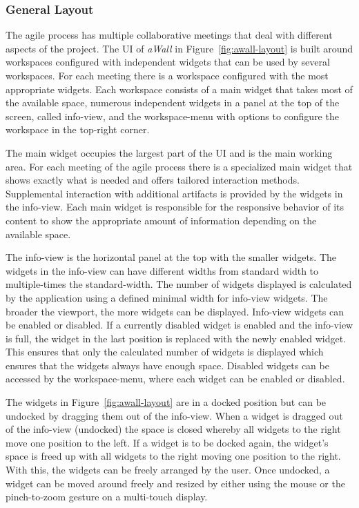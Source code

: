 \documentclass{sigchi}
\begin{document}
\subsubsection{General Layout}

The agile process has multiple collaborative meetings that deal with different aspects of the project.
The UI of \textit{aWall} in Figure~\ref{fig:awall-layout} is built around workspaces configured with independent widgets that can be used by several workspaces.
For each meeting there is a workspace configured with the most appropriate widgets.
Each workspace consists of a main widget that takes most of the available space, numerous independent widgets in a panel at the top of the screen, called info-view, and the workspace-menu with options to configure the workspace in the top-right corner.

The main widget occupies the largest part of the UI and is the main working area.
For each meeting of the agile process there is a specialized main widget that shows exactly what is needed and offers tailored interaction methods.
Supplemental interaction with additional artifacts is provided by the widgets in the info-view.
Each main widget is responsible for the responsive behavior of its content to show the appropriate amount of information depending on the available space.

The info-view is the horizontal panel at the top with the smaller widgets.
The widgets in the info-view can have different widths from standard width to multiple-times the standard-width.
The number of widgets displayed is calculated by the application using a defined minimal width for info-view widgets. 
The broader the viewport, the more widgets can be displayed.
Info-view widgets can be enabled or disabled.
If a currently disabled widget is enabled and the info-view is full, the widget in the last position is replaced with the newly enabled widget.
This ensures that only the calculated number of widgets is displayed which ensures that the widgets always have enough space.
Disabled widgets can be accessed by the workspace-menu, where each widget can be enabled or disabled. 

The widgets in Figure~\ref{fig:awall-layout} are in a docked position but can be undocked by dragging them out of the info-view.
When a widget is dragged out of the info-view (undocked) the space is closed whereby all widgets to the right move one position to the left.
If a widget is to be docked again, the widget's space is freed up with all widgets to the right moving one position to the right.
With this, the widgets can be freely arranged by the user.
Once undocked, a widget can be moved around freely and resized by either using the mouse or the pinch-to-zoom gesture on a multi-touch display. 
\end{document}
